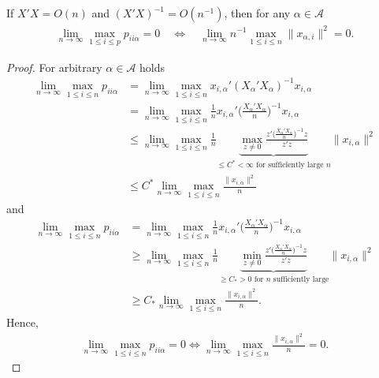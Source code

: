 \documentclass[Research_Module_ES.tex]{subfiles}
\begin{document}
\begin{claim}
	If $X'X=O(n)$ and $(X'X)^{-1}=O(n^{-1})$, then for any $\alpha \in \mathcal{A}$
	\begin{align*}
		\lim_{n\to \infty} \max_{1\le i \le p} p_{ii\alpha}=0  \quad \iff \quad 
		 \lim_{n\to \infty} n^{-1}\max_{1\le i \le n} \lVert x_{\alpha,i}\rVert ^2 = 0.
	\end{align*}
\end{claim}
\begin{proof}
	For arbitrary $\alpha \in \mathcal{A}$ holds
	\begin{align*}
	\lim_{n\to\infty} \max_{1\le i\le n} p_{ii\alpha} &= \lim_{n\to\infty} \max_{1\le i\le n} x_{i,\alpha}'(X_\alpha'X_\alpha)^{-1} x_{i,\alpha} \\
	&= \lim_{n\to\infty} \max_{1\le i\le n} \frac{1}{n} x_{i,\alpha}'\biggl(\frac{X_\alpha'X_\alpha}{n}\biggr)^{-1} x_{i,\alpha} \\
	&\le \lim_{n\to\infty} \max_{1\le i\le n} \frac{1}{n} \underbrace{\max_{z\neq 0} \frac{z'\bigl(\frac{X_\alpha'X_\alpha}{n}\bigr)^{-1}z}{z'z}}_{\le C^\ast < \infty \textrm{ for sufficiently large $n$} }  \lVert x_{i,\alpha} \rVert ^2 \\
	&\le C^\ast \lim_{n\to \infty} \max_{1\le i \le n} \frac{\lVert x_{i,\alpha}\rVert ^2}{n}
	\end{align*}
	and 
	\begin{align*}
	\lim_{n\to \infty} \max_{1\le i \le n} p_{ii\alpha} &=  \lim_{n\to\infty} \max_{1\le i\le n} \frac{1}{n} x_{i,\alpha}'\biggl(\frac{X_\alpha'X_\alpha}{n}\biggr)^{-1} x_{i,\alpha} \\
	&\ge \lim_{n\to\infty} \max_{1\le i\le n} \frac{1}{n} \underbrace{\min_{z\neq 0} \frac{z'\bigl(\frac{X_\alpha'X_\alpha}{n}\bigr)^{-1}z}{z'z}}_{\ge C_\ast > 0 \textrm{ for $n$ sufficiently large}} \lVert x_{i,\alpha} \rVert ^2\\
	&\ge C_\ast \lim_{n\to\infty} \max_{1\le i\le n} \frac{\lVert x_{i,\alpha}\rVert^2}{n}.
	\end{align*}
	Hence, 
	\begin{align*}
	\lim_{n\to \infty} \max_{1\le i \le n} p_{ii\alpha} = 0 \iff \lim_{n\to\infty} \max_{1\le i\le n} \frac{\lVert x_{i,\alpha}\rVert^2}{n} = 0.
	\end{align*}
\end{proof}
\end{document}
